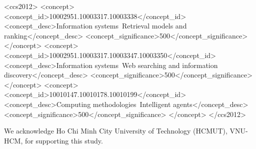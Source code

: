\documentclass[sigconf,balance=false]{acmart}
\begin{document}
\begin{CCSXML}
<ccs2012>
<concept>
<concept_id>10002951.10003317.10003338</concept_id>
<concept_desc>Information systems~Retrieval models and ranking</concept_desc>
<concept_significance>500</concept_significance>
</concept>
<concept>
<concept_id>10002951.10003317.10003347.10003350</concept_id>
<concept_desc>Information systems~Web searching and information discovery</concept_desc>
<concept_significance>500</concept_significance>
</concept>
<concept>
<concept_id>10010147.10010178.10010199</concept_id>
<concept_desc>Computing methodologies~Intelligent agents</concept_desc>
<concept_significance>500</concept_significance>
</concept>
</ccs2012>
\end{CCSXML}


\maketitle









\label{body:end}
\clearpage


\begin{acks}
We acknowledge Ho Chi Minh City University of Technology (HCMUT), VNU-HCM,
for supporting this study.
\end{acks}



\end{document}
